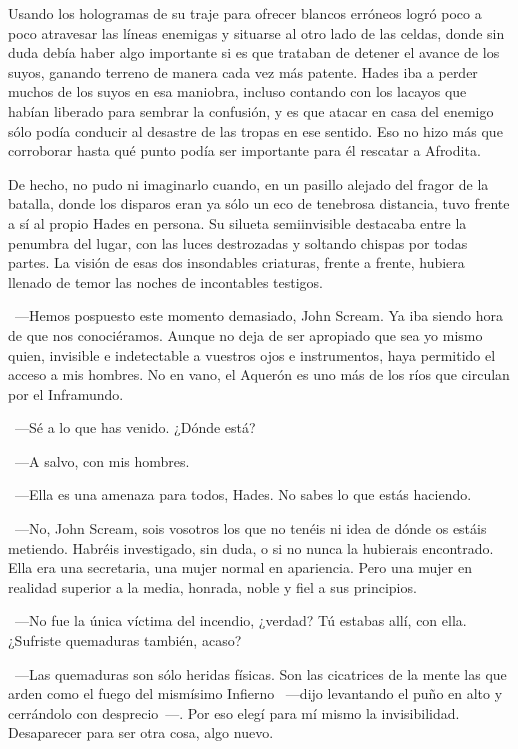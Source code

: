 Usando los hologramas de su traje para ofrecer blancos erróneos logró poco a poco atravesar las líneas enemigas y situarse al otro lado de las celdas, donde sin duda debía haber algo importante si es que trataban de detener el avance de los suyos, ganando terreno de manera cada vez más patente. Hades iba a perder muchos de los suyos en esa maniobra, incluso contando con los lacayos que habían liberado para sembrar la confusión, y es que atacar en casa del enemigo sólo podía conducir al desastre de las tropas en ese sentido. Eso no hizo más que corroborar hasta qué punto podía ser importante para él rescatar a Afrodita.

De hecho, no pudo ni imaginarlo cuando, en un pasillo alejado del fragor de la batalla, donde los disparos eran ya sólo un eco de tenebrosa distancia, tuvo frente a sí al propio Hades en persona. Su silueta semiinvisible destacaba entre la penumbra del lugar, con las luces destrozadas y soltando chispas por todas partes. La visión de esas dos insondables criaturas, frente a frente, hubiera llenado de temor las noches de incontables testigos.

~---Hemos pospuesto este momento demasiado, John Scream. Ya iba siendo hora de que nos conociéramos. Aunque no deja de ser apropiado que sea yo mismo quien, invisible e indetectable a vuestros ojos e instrumentos, haya permitido el acceso a mis hombres. No en vano, el Aquerón es uno más de los ríos que circulan por el Inframundo.

~---Sé a lo que has venido. ¿Dónde está?

~---A salvo, con mis hombres.

~---Ella es una amenaza para todos, Hades. No sabes lo que estás haciendo.

~---No, John Scream, sois vosotros los que no tenéis ni idea de dónde os estáis metiendo. Habréis investigado, sin duda, o si no nunca la hubierais encontrado. Ella era una secretaria, una mujer normal en apariencia. Pero una mujer en realidad superior a la media, honrada, noble y fiel a sus principios.

~---No fue la única víctima del incendio, ¿verdad? Tú estabas allí, con ella. ¿Sufriste quemaduras también, acaso?

~---Las quemaduras son sólo heridas físicas. Son las cicatrices de la mente las que arden como el fuego del mismísimo Infierno ~---dijo levantando el puño en alto y cerrándolo con desprecio~---. Por eso elegí para mí mismo la invisibilidad. Desaparecer para ser otra cosa, algo nuevo.

